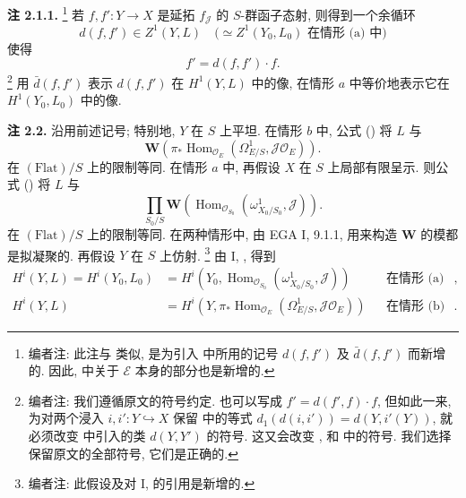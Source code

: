 \medskip
\noindent{}\textbf{注 2.1.1.}
\footnote{编者注: 此注与  类似,
是为引入  中所用的记号
\(d(f,f')\) 及 \(\bar d(f,f')\) 而新增的.
因此, 
中关于 \(\mathcal E\) 本身的部分也是新增的.}
若 \(f,f':Y\to X\) 是延拓 \(f_{\mathscr J}\) 的
\(S\)-群函子态射, 则得到一个余循环
\[
 d(f,f')\in Z^1(Y,L)
 \quad\bigl(\simeq Z^1(Y_0,L_0)\text{ 在情形 (a) 中}\bigr)
\]
使得
\begin{equation}
 f'=d(f,f')\cdot f.
 \tag{*}\label{sga3:iii:remark:2-1-1:equation:star}
\end{equation}
\footnote{编者注: 我们遵循原文的符号约定. 也可以写成
\(f'=d(f',f)\cdot f\), 但如此一来, 为对两个浸入
\(i,i':Y\hookrightarrow X\) 保留 
中的等式 \(d_1(d(i,i'))=d(Y,i'(Y))\),
就必须改变 
中引入的类 \(d(Y,Y')\) 的符号. 这又会改变
,
 和 
中的符号. 我们选择保留原文的全部符号, 它们是正确的.}
用 \(\bar d(f,f')\) 表示 \(d(f,f')\) 在
\(H^1(Y,L)\) 中的像, 在情形 \(a\) 中等价地表示它在
\(H^1(Y_0,L_0)\) 中的像.

\medskip
\noindent{}\textbf{注 2.2.}
沿用前述记号; 特别地, \(Y\) 在 \(S\) 上平坦.
在情形 \(b\) 中, 公式 ()
将 \(L\) 与
\[
 \mathbf W\!\left(
  \pi_*\operatorname{Hom}_{\mathscr O_E}
  (\Omega^1_{E/S},\mathscr J\mathscr O_E)
 \right).
\]
在 \((\mathrm{Flat})/S\) 上的限制等同.
在情形 \(a\) 中, 再假设 \(X\) 在 \(S\) 上局部有限呈示.
则公式 ()
将 \(L\) 与
\[
 \prod_{S_0/S}\mathbf W\!\left(
  \operatorname{Hom}_{\mathscr O_{S_0}}
   (\omega^1_{X_0/S_0},\mathscr J)
 \right).
\]
在 \((\mathrm{Flat})/S\) 上的限制等同.
在两种情形中, 由 EGA I, 9.1.1, 用来构造 \(\mathbf W\) 的模都是拟凝聚的.
再假设 \(Y\) 在 \(S\) 上仿射.
\footnote{编者注: 此假设及对 I, 
的引用是新增的.} 由 I, , 得到
\begin{align*}
 H^i(Y,L)=H^i(Y_0,L_0)
  &=H^i\!\left(Y_0,
    \operatorname{Hom}_{\mathscr O_{S_0}}
    (\omega^1_{X_0/S_0},\mathscr J)\right)
  &&\text{在情形 (a) 中},\\
 H^i(Y,L)
  &=H^i\!\left(Y,
    \pi_*\operatorname{Hom}_{\mathscr O_E}
    (\Omega^1_{E/S},\mathscr J\mathscr O_E)\right)
  &&\text{在情形 (b) 中}.
\end{align*}

